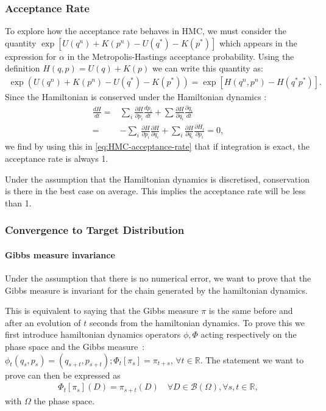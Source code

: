 \documentclass[a4paper, 12pt,oneside]{article}
\begin{document}
			\subsubsection{Acceptance Rate}
			To explore how the acceptance rate behaves in HMC, we must consider the quantity \newline $\exp \left[U\left(q^n\right)+K\left(p^n\right)-U\left(q^*\right)-K\left(p^*\right)\right]$ which appears in the expression for $\alpha$ in the Metropolis-Hastings acceptance probability. Using the definition $H(q, p)=U(q)+K(p)$ we can write this quantity as:
			\begin{gather}
				\exp \left(U\left(q^n\right)+K\left(p^n\right)-U\left(q^*\right)-K\left(p^*\right)\right) = \exp \left[H\left(q^n, p^n\right)-H\left(q^* p^*\right)\right].
				\label{eq:HMC-acceptance-rate} 
			\end{gather}
			Since the Hamiltonian is conserved under the Hamiltonian dynamics :
			\begin{align}
			\frac{d H}{d t}=&\sum_i \frac{\partial H}{\partial p_i} \frac{d p_i}{d t}+\sum \frac{\partial H}{\partial q_i} \frac{\partial q_i}{d t} \\
			=&-\sum_i \frac{\partial H}{\partial p_i} \frac{\partial H}{\partial q_i}+\sum_i \frac{\partial H}{\partial q_i} \frac{\partial H_i}{\partial p_i} = 0,
			\end{align}
			we find by using this in \ref{eq:HMC-acceptance-rate} that if integration is exact, the acceptance rate is always 1.

			Under the assumption that the Hamiltonian dynamics is discretised, conservation is there in the best case on average. This implies the acceptance rate will be less than 1. 
			\subsubsection{Convergence to Target Distribution}
			\paragraph{Gibbs measure invariance}
			Under the assumption that there is no numerical error, we want to prove that the Gibbs measure is invariant for the chain generated by the hamiltonian dynamics.
	
			This is equivalent to saying that the Gibbs measure $\pi$ is the same before and after an evolution of $t$ seconds from the hamiltonian dynamics. 
			To prove this we first introduce hamiltonian dynamics operators $\phi,\Phi$ acting respectively on the phase space and the Gibbs measure~: $\phi_t(q_s,p_s)=(q_{s+t},p_{s+t});\Phi_t[\pi_s]=\pi_{t+s}$, $\forall t\in\mathbb{R}$.
			The statement we want to prove can then be expressed as 
			\begin{gather}
				\Phi_t[\pi_s](D)=\pi_{s+t}(D)\quad \forall D\in\mathcal{B}(\Omega),\forall s,t\in\mathbb{R},
			\end{gather}
			with $\Omega$ the phase space.
	
\end{document}

